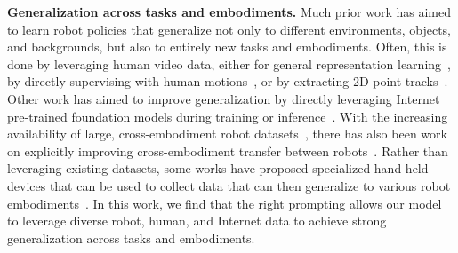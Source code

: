 \documentclass[conference]{IEEEtran}
\begin{document}
\noindent \textbf{Generalization across tasks and embodiments.} Much prior work has aimed to learn robot policies that generalize not only to different environments, objects, and backgrounds, but also to entirely new tasks and embodiments.
Often, this is done by leveraging human video data, either for general representation learning~\citep{nair2023r3m,ma2022vip,xiao2022masked,bhateja2023robotic,zhou2021manipulator,bharadhwaj2023visual}, by directly supervising with human motions~\citep{chen2026dexterous,shaw2023videodex,bharadhwaj2023zero,bahl2022human,bahl2023affordances,kareer2025egomimic,kareer2025emergence,shi2025learning}, or by extracting 2D point tracks~\citep{bharadhwaj2024track2act,vecerik2024robotap,wen2023any,gu2024rttrajectory}.
Other work has aimed to improve generalization by directly leveraging Internet pre-trained foundation models during training or inference~\citep{kapelyukh2023dall,mandi2022cacti,chen2023genaug,yu2023scaling,stone2023open,driess2023palme,jiang2023vima}.
With the increasing availability of large, cross-embodiment robot datasets~\citep{collaboration2023open}, there has also been work on explicitly improving cross-embodiment transfer between robots~\citep{yang2026data,Doshi24-crossformer,yang2024pushing,zha2026lap,grover2025enhancing,ai2025towards,he2025scaling}.
Rather than leveraging existing datasets, some works have proposed specialized hand-held devices that can be used to collect data that can then generalize to various robot embodiments~\citep{chi2024universal,young2021visual}.
In this work, we find that the right prompting allows our model to leverage diverse robot, human, and Internet data to achieve strong generalization across tasks and embodiments.
\end{document}
